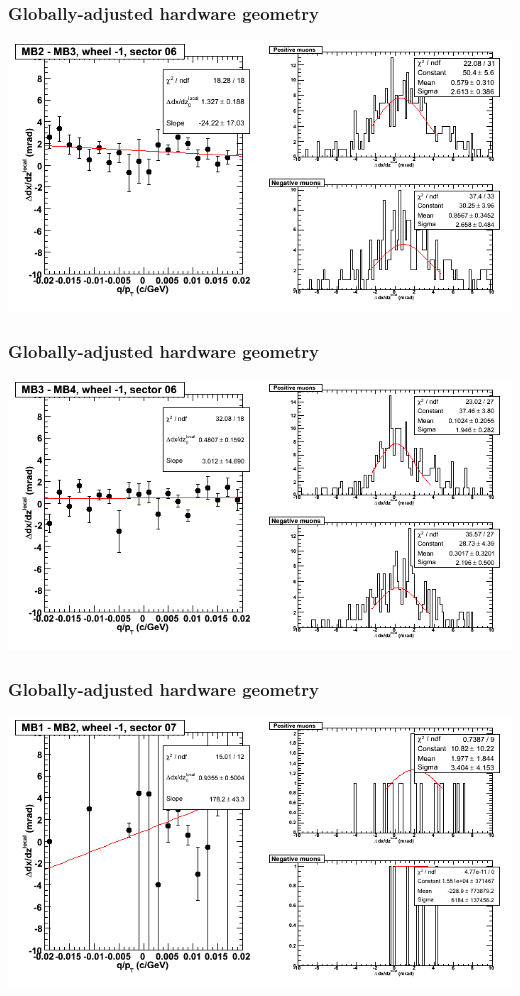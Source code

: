 \documentclass[compress]{beamer}
\begin{document}
\begin{frame}
\frametitle{Globally-adjusted hardware geometry}
\includegraphics[width=\linewidth]{NOV4_segdiffs_HW/dt13_slope_B_06_23.png}
\end{frame}

\begin{frame}
\frametitle{Globally-adjusted hardware geometry}
\includegraphics[width=\linewidth]{NOV4_segdiffs_HW/dt13_slope_B_06_34.png}
\end{frame}

\begin{frame}
\frametitle{Globally-adjusted hardware geometry}
\includegraphics[width=\linewidth]{NOV4_segdiffs_HW/dt13_slope_B_07_12.png}
\end{frame}
\end{document}
